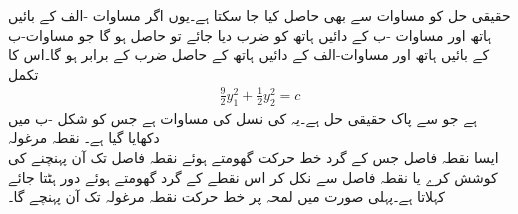 حقیقی حل کو مساوات  سے بھی حاصل کیا جا سکتا ہے۔یوں اگر مساوات -الف کے بائیں ہاتھ اور مساوات -ب کے دائیں ہاتھ کو ضرب دیا جائے تو  حاصل ہو گا جو مساوات-ب کے بائیں ہاتھ اور مساوات-الف کے دائیں ہاتھ کے حاصل ضرب  کے برابر  ہو گا۔اس کا تکمل
\begin{align}
\frac{9}{2}y_1^2+\frac{1}{2}y_2^2=c
\end{align}
 ہے جو  سے پاک حقیقی حل ہے۔یہ  کی نسل کی مساوات ہے جس کو شکل -ب  میں دکھایا گیا ہے۔
\quad نقطہ مرغولہ\\
ایسا نقطہ فاصل جس کے گرد خط حرکت گھومتے ہوئے نقطہ فاصل تک آن پہنچنے کی کوشش کرے یا نقطہ فاصل سے نکل کر اس نقطے کے گرد گھومتے ہوئے دور ہٹتا جائے  کہلاتا ہے۔پہلی صورت میں لمحہ  پر خط حرکت نقطہ مرغولہ تک آن پہنچے گا۔

